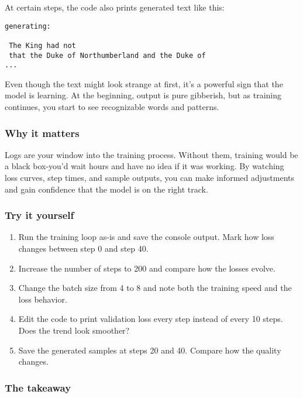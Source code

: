 \documentclass[
  letterpaper,
  DIV=11,
  numbers=noendperiod]{scrreprt}
\providecommand{\tightlist}{%
  \setlength{\itemsep}{0pt}\setlength{\parskip}{0pt}}
\begin{document}
At certain steps, the code also prints generated text like this:

\begin{verbatim}
generating:

 The King had not
 that the Duke of Northumberland and the Duke of
...
\end{verbatim}

Even though the text might look strange at first, it's a powerful sign
that the model is learning. At the beginning, output is pure gibberish,
but as training continues, you start to see recognizable words and
patterns.

\subsubsection{Why it matters}\label{why-it-matters-30}

Logs are your window into the training process. Without them, training
would be a black box-you'd wait hours and have no idea if it was
working. By watching loss curves, step times, and sample outputs, you
can make informed adjustments and gain confidence that the model is on
the right track.

\subsubsection{Try it yourself}\label{try-it-yourself-38}

\begin{enumerate}
\def\labelenumi{\arabic{enumi}.}
\tightlist
\item
  Run the training loop as-is and save the console output. Mark how loss
  changes between step 0 and step 40.
\item
  Increase the number of steps to 200 and compare how the losses evolve.
\item
  Change the batch size from 4 to 8 and note both the training speed and
  the loss behavior.
\item
  Edit the code to print validation loss every step instead of every 10
  steps. Does the trend look smoother?
\item
  Save the generated samples at steps 20 and 40. Compare how the quality
  changes.
\end{enumerate}

\subsubsection{The takeaway}\label{the-takeaway-39}
\end{document}
